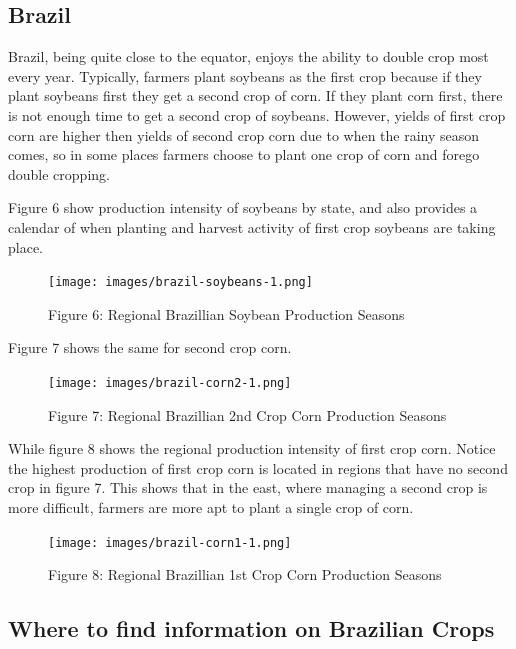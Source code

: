\documentclass[
]{book}
\begin{document}
\hypertarget{brazil}{%
\subsection{Brazil}\label{brazil}}

Brazil, being quite close to the equator, enjoys the ability to double crop most every year. Typically, farmers plant soybeans as the first crop because if they plant soybeans first they get a second crop of corn. If they plant corn first, there is not enough time to get a second crop of soybeans. However, yields of first crop corn are higher then yields of second crop corn due to when the rainy season comes, so in some places farmers choose to plant one crop of corn and forego double cropping.

Figure 6 show production intensity of soybeans by state, and also provides a calendar of when planting and harvest activity of first crop soybeans are taking place.

\begin{figure}
\centering
\texttt{[image: images/brazil-soybeans-1.png]}
\caption{Figure 6: Regional Brazillian Soybean Production Seasons}
\end{figure}

Figure 7 shows the same for second crop corn.

\begin{figure}
\centering
\texttt{[image: images/brazil-corn2-1.png]}
\caption{Figure 7: Regional Brazillian 2nd Crop Corn Production Seasons}
\end{figure}

While figure 8 shows the regional production intensity of first crop corn. Notice the highest production of first crop corn is located in regions that have no second crop in figure 7. This shows that in the east, where managing a second crop is more difficult, farmers are more apt to plant a single crop of corn.

\begin{figure}
\centering
\texttt{[image: images/brazil-corn1-1.png]}
\caption{Figure 8: Regional Brazillian 1st Crop Corn Production Seasons}
\end{figure}

\hypertarget{where-to-find-information-on-brazilian-crops}{%
\subsection{Where to find information on Brazilian Crops}\label{where-to-find-information-on-brazilian-crops}}
\end{document}
